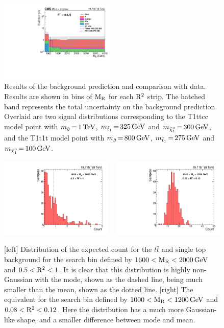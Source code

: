 \begin{figure}[htpb]
\includegraphics[width=0.49\textwidth]{figures/razor_results/bg_prediction_plot_R2bin4_BPS}
\caption{Results of the background prediction and comparison with data. Results are shown in bins of
$\mathrm{M_R}$ for each $\mathrm{R^2}$ strip. 
The hatched band represents the total uncertainty on the background prediction. 
Overlaid are two signal distributions corresponding to the T1ttcc model point with
$m_{\tilde{g}} \,{=}\, 1\,\text{Te\hspace{-.08em}V}$, $m_{\tilde{t}_1} \,{=}\, 325\,\text{Ge\hspace{-.08em}V}$ and $m_{\tilde{\chi}_1^0} \,{=}\,
300\,\text{Ge\hspace{-.08em}V}$, and the T1t1t model point with $m_{\tilde{g}} \,{=}\, 800\,\text{Ge\hspace{-.08em}V}$, $m_{\tilde{t}_1}
\,{=}\, 275\,\text{Ge\hspace{-.08em}V}$ and $m_{\tilde{\chi}_1^0} \,{=}\, 100\,\text{Ge\hspace{-.08em}V}$. 
\label{fig:results_prediction}}
\end{figure}



\begin{figure}[htpb]
  \centering
  \includegraphics[width=0.48\textwidth]{figures/razor_results/mean_mode_b_S_TTJ_019}
  ~
  \includegraphics[width=0.48\textwidth]{figures/razor_results/mean_mode_b_S_TTJ_005}
  \caption{[left] Distribution of the expected count for the $t\bar{t}$ and single top background
for the search bin defined by $1600 < \mathrm{M_R} < 2000\,\text{Ge\hspace{-.08em}V}$ and $0.5 < \mathrm{R^2} < 1$. It is clear that this
distribution is highly non-Gaussian with the mode, shown as the dashed line, being much smaller than
the mean, shown as the dotted line. [right] The equivalent for the search bin defined by $1000 < \mathrm{M_R}
< 1200\,\text{Ge\hspace{-.08em}V}$ and $0.08 < \mathrm{R^2} < 0.12$. Here the distribution has a much more Gaussian-like shape,
and a smaller difference between mode and mean.
  \label{fig:boost_results_mean_mode}}
\end{figure}



